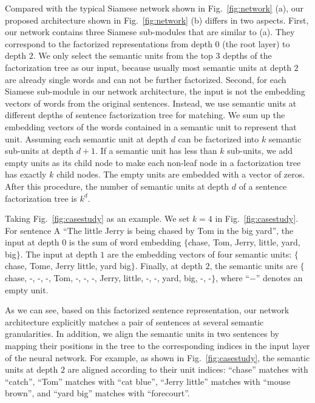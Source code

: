 Compared with the typical Siamese network shown in Fig.~\ref{fig:network} (a), our proposed architecture shown in Fig.~\ref{fig:network} (b) differs in two aspects.
First, our network contains three Siamese sub-modules that are similar to (a). They correspond to the factorized representations from depth $0$ (the root layer) to depth $2$. We only select the semantic units from the top $3$ depths of the factorization tree as our input, because usually most semantic units at depth $2$ are already single words and can not be further factorized. Second, for each Siamese sub-module in our network architecture, the input is not the embedding vectors of words from the original sentences. Instead, we use semantic units at different depths of sentence factorization tree 
for matching.
We sum up the embedding vectors of the words contained in a semantic unit to represent that unit. Assuming each semantic unit at depth $d$ can be factorized into $k$ semantic sub-units at depth $d + 1$. If a semantic unit has less than $k$ sub-units, we add empty units as its child node to make each non-leaf node in a factorization tree has exactly $k$ child nodes. The empty units are embedded with a vector of zeros. After this procedure, the number of semantic units at depth $d$ of a sentence factorization tree is $k^d$.

Taking Fig.~\ref{fig:casestudy} as an example. We set $k = 4$ in Fig.~\ref{fig:casestudy}. For sentence A ``The little Jerry is being chased by Tom in the big yard'', the input at depth $0$ is the sum of word embedding $\{$chase, Tom, Jerry, little, yard, big$\}$. The input at depth $1$ are the embedding vectors of four semantic units: 
$\{$chase, Tome, Jerry little, yard big$\}$. Finally, at depth $2$, the semantic units are $\{$chase, -, -, -, Tom, -, -, -, Jerry, little, -, -, yard, big, -, -$\}$, where ``$-$'' denotes an empty unit.

As we can see, based on this factorized sentence representation, our network architecture explicitly matches a pair of sentences at several semantic granularities. 
In addition, we align the semantic units in two sentences by mapping their positions in the tree to the corresponding indices in the input layer of the neural network.
For example, as shown in Fig.~\ref{fig:casestudy}, the semantic units at depth $2$ are aligned according to their unit indices: ``chase'' matches with ``catch'', ``Tom'' matches with ``cat blue'', ``Jerry little'' matches with ``mouse brown'', and ``yard big'' matches with ``forecourt''.



